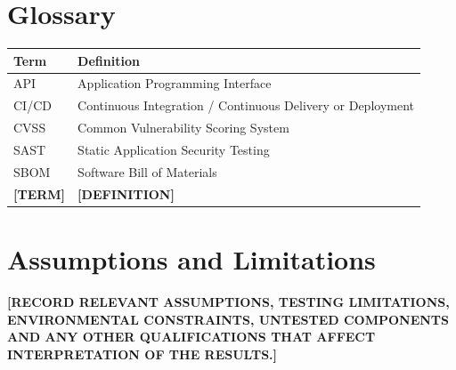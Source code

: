 \documentclass[11pt,a4paper]{report}
\newcommand{\placeholder}[1]{\textbf{[#1]}}
\begin{document}
\chapter{Glossary}
\begin{longtable}{@{}p{35mm}p{115mm}@{}}
    \toprule
    \textbf{Term} & \textbf{Definition} \\
    \midrule
    API & Application Programming Interface \\
    CI/CD & Continuous Integration / Continuous Delivery or Deployment \\
    CVSS & Common Vulnerability Scoring System \\
    SAST & Static Application Security Testing \\
    SBOM & Software Bill of Materials \\
    \placeholder{TERM} & \placeholder{DEFINITION} \\
    \bottomrule
\end{longtable}

\chapter{Assumptions and Limitations}
\placeholder{RECORD RELEVANT ASSUMPTIONS, TESTING LIMITATIONS, ENVIRONMENTAL
CONSTRAINTS, UNTESTED COMPONENTS AND ANY OTHER QUALIFICATIONS THAT AFFECT
INTERPRETATION OF THE RESULTS.}
\end{document}
